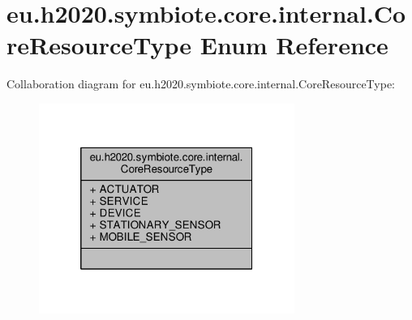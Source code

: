 \hypertarget{enumeu_1_1h2020_1_1symbiote_1_1core_1_1internal_1_1CoreResourceType}{}\section{eu.\+h2020.\+symbiote.\+core.\+internal.\+Core\+Resource\+Type Enum Reference}
\label{enumeu_1_1h2020_1_1symbiote_1_1core_1_1internal_1_1CoreResourceType}


Collaboration diagram for eu.\+h2020.\+symbiote.\+core.\+internal.\+Core\+Resource\+Type\+:
\nopagebreak
\begin{figure}[H]
\begin{center}
\leavevmode
\includegraphics[width=236pt]{enumeu_1_1h2020_1_1symbiote_1_1core_1_1internal_1_1CoreResourceType__coll__graph}
\end{center}
\end{figure}
